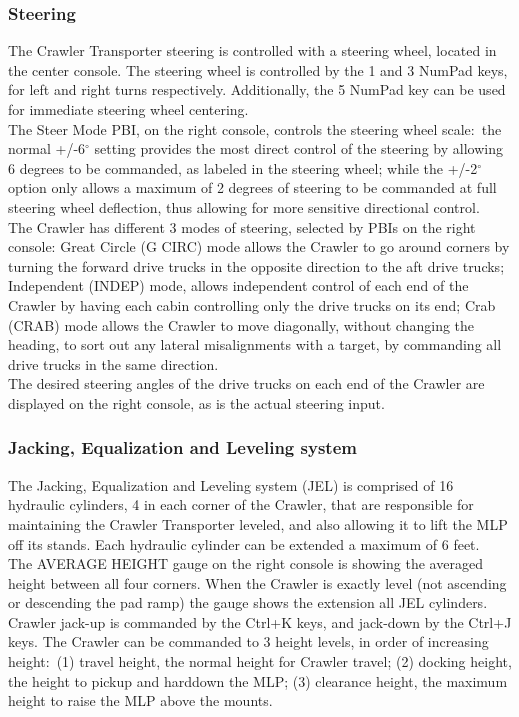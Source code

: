 \documentclass[Space_Shuttle_Vessel_Manual.tex]{subfiles}
\begin{document}
\begin{multicols*}{2}
\subsubsection{Steering}
The Crawler Transporter steering is controlled with a steering wheel, located in the center console. The steering wheel is controlled by the 1 and 3 NumPad keys, for left and right turns respectively. Additionally, the 5 NumPad key can be used for immediate steering wheel centering.\\
The Steer Mode PBI, on the right console, controls the steering wheel scale$\colon$ the normal +/-6$^\circ$ setting provides the most direct control of the steering by allowing 6 degrees to be commanded, as labeled in the steering wheel; while the +/-2$^\circ$ option only allows a maximum of 2 degrees of steering to be commanded at full steering wheel deflection, thus allowing for more sensitive directional control.\\
The Crawler has different 3 modes of steering, selected by PBIs on the right console: Great Circle (G CIRC) mode allows the Crawler to go around corners by turning the forward drive trucks in the opposite direction to the aft drive trucks; Independent (INDEP) mode, allows independent control of each end of the Crawler by having each cabin controlling only the drive trucks on its end; Crab (CRAB) mode allows the Crawler to move diagonally, without changing the heading, to sort out any lateral misalignments with a target, by commanding all drive trucks in the same direction.\\
The desired steering angles of the drive trucks on each end of the Crawler are displayed on the right console, as is the actual steering input.
\\

\subsubsection{Jacking, Equalization and Leveling system}
The Jacking, Equalization and Leveling system (JEL) is comprised of 16 hydraulic cylinders, 4 in each corner of the Crawler, that are responsible for maintaining the Crawler Transporter leveled, and also allowing it to lift the MLP off its stands. Each hydraulic cylinder can be extended a maximum of 6 feet.\\
The AVERAGE HEIGHT gauge on the right console is showing the averaged height between all four corners. When the Crawler is exactly level (not ascending or descending the pad ramp) the gauge shows the extension all JEL cylinders.\\
Crawler jack-up is commanded by the Ctrl+K keys, and jack-down by the Ctrl+J keys. The Crawler can be commanded to 3 height levels, in order of increasing height$\colon$ (1) travel height, the normal height for Crawler travel; (2) docking height, the height to pickup and harddown the MLP; (3) clearance height, the maximum height to raise the MLP above the mounts.
\\


\end{multicols*}
\end{document}
